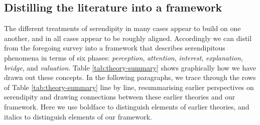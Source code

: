 \subsection{Distilling the literature into a framework} \label{sec:distill}

The different treatments of serendipity in many cases appear to build
on one another, and in all cases appear to be roughly aligned.
Accordingly we can distil from the foregoing survey into a framework
that describes serendipitous phenomena in terms of six phases:
\emph{perception}, \emph{attention}, \emph{interest},
\emph{explanation}, \emph{bridge}, and \emph{valuation}.  Table
\ref{tab:theory-summary} shows graphically how we have drawn out these concepts.
In the following paragraphs, we trace through the rows of Table
\ref{tab:theory-summary} line by line, resummarising earlier
perspectives on serendipity and drawing connections between
these earlier theories and our framework.
Here we use boldface to distinguish elements of earlier theories, and
italics to distinguish elements of our framework.
